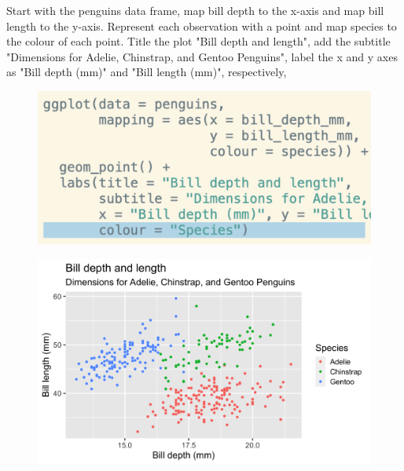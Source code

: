 \documentclass[11pt]{beamer}
\begin{document}
	\begin{frame}
	
	\small{Start with the penguins data frame, map bill depth to the x-axis and map bill length to the y-axis. Represent each observation with a point and map species to the colour of each point. Title the plot "Bill depth and length", add the subtitle "Dimensions for Adelie, Chinstrap, and Gentoo Penguins", label the x and y axes as "Bill depth (mm)" and "Bill length (mm)", respectively, }
	
	\begin{minipage}[t]{0.5\linewidth}
		\begin{figure}
			\centering
			\includegraphics[width=1\linewidth]{Images/S2/code/s14}
			
		\end{figure}
	\end{minipage}%
	\begin{minipage}[t]{0.5\linewidth}
		
		\begin{figure}
			\centering
			\includegraphics[width=1\linewidth]{Images/S2/penguins-8-1}
			
		\end{figure}
		
		
	\end{minipage}
	
\end{frame}
\end{document}
